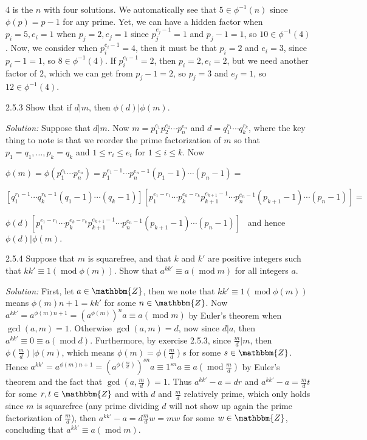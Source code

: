 \documentclass{letter}
\newcommand{\tmem}[1]{{\em #1\/}}
\newcommand{\tmop}[1]{\ensuremath{\operatorname{#1}}}
\begin{document}
4 is the $n$ with four solutions. We automatically see that $5 \in \phi^{- 1}
(n)$ since $\phi (p) = p - 1$ for any prime. Yet, we can have a hidden factor
when $p_i = 5, e_i = 1$ when $p_j = 2, e_j = 1$ since $p_j^{e_j - 1} = 1$ and
$p_j - 1 = 1$, so $10 \in \phi^{- 1} (4)$. Now, we consider when $p_i^{e_i -
1} = 4$, then it must be that $p_i = 2$ and $e_i = 3$, since $p_i - 1 = 1$, so
$8 \in \phi^{- 1} (4)$. If $p_i^{e_i - 1} = 2$, then $p_i = 2, e_i = 2$, but
we need another factor of $2$, which we can get from $p_j - 1 = 2$, so $p_j =
3$ and $e_j = 1$, so $12 \in \phi^{- 1} (4)$.

2.5.3 Show that if $d | m$, then $\phi (d) | \phi (m)$.

{\tmem{Solution:}} Suppose that $d | m$. Now $m = p_1^{e_1} p^{e_2}_2 \cdots
p^{e_n}_n$ and $d = q_1^{r_1} \cdots q_k^{r_k}$, where the key thing to note
is that we reorder the prime factorization of $m$ so that $p_1 = q_1, \ldots,
p_k = q_k$ and $1 \leq r_i \leq e_i$ for $1 \leq i \leq k$. Now

$\phi (m) = \phi (p_1^{e_1} \cdots p_n^{e_n}) = p_1^{e_1 - 1} \cdots p_n^{e_n
- 1} (p_1 - 1) \cdots (p_n - 1) =$

$[q_1^{r_1 - 1} \cdots q_k^{r_k - 1} (q_1 - 1) \cdots (q_k - 1)] [p_1^{e_1 -
r_1} \cdots p_k^{e_k - r_k} p_{k + 1}^{e_{k + 1} - 1} \cdots p_n^{e_n - 1}
(p_{k + 1} - 1) \cdots (p_n - 1)] =$

$\phi (d)_{} [p_1^{e_1 - r_1} \cdots p_k^{e_k - r_k} p_{k + 1}^{e_{k + 1} - 1}
\cdots p_n^{e_n - 1} (p_{k + 1} - 1) \cdots (p_n - 1)]$ \ and hence $\phi (d)
| \phi (m)$.

2.5.4 Suppose that $m$ is squarefree, and that $k$ and $k'$ are positive
integers such that $k k' \equiv 1 (\tmop{mod} \phi (m))$. Show that $a^{k k'}
\equiv a (\tmop{mod} m)$ for all integers $a$.

{\tmem{Solution:}} First, let $a \in \mathbbm{Z}$, then we note that $k k'
\equiv 1 (\tmop{mod} \phi (m))$ means $\phi (m) n + 1 = k k'$ for some $n \in
\mathbbm{Z}$. Now $a^{k k'} = a^{\phi (m) n + 1} = (a^{\phi (m)})^n a \equiv a
(\tmop{mod} m)$ by Euler's theorem when $\gcd (a, m) = 1$. Otherwise $\gcd (a,
m) = d$, now since $d | a$, then $a^{k k'} \equiv 0 \equiv a (\tmop{mod} d)$.
Furthermore, by exercise 2.5.3, since $\frac{m}{d} | m$, then $\phi (
\frac{m}{d}) | \phi (m)$, which means $\phi (m) = \phi ( \frac{m}{d}) s$ for
some $s \in \mathbbm{Z}$. Hence $a^{k k'} = a^{\phi (m) n + 1} = (a^{\phi (
\frac{m}{d})})^{s n} a \equiv 1^{s n} a \equiv a (\tmop{mod} \frac{m}{d})$ by
Euler's theorem and the fact that $\gcd (a, \frac{m}{d}) = 1$. Thus $a^{k k'}
- a = d r$ and $a^{k k'} - a = \frac{m}{d} t$ for some $r, t \in \mathbbm{Z}$
and with $d$ and $\frac{m}{d}$ relatively prime, which only holds since $m$ is
squarefree (any prime dividing $d$ will not show up again the prime
factorization of $\frac{m}{d}$), then $a^{k k'} - a = d \frac{m}{d} w = m w$
for some $w \in \mathbbm{Z}$, concluding that $a^{k k'} \equiv a (\tmop{mod}
m)$.
\end{document}
